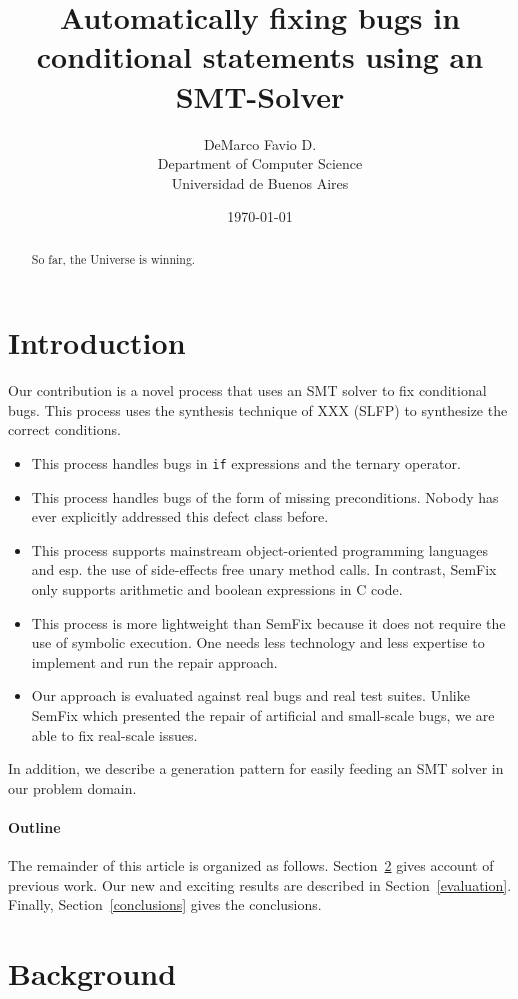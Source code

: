 \documentclass[a4paper,10pt,twocolumn]{article}
\date{\today}
\title{Automatically fixing bugs in conditional statements using an SMT-Solver}
\author{
        DeMarco Favio D. \\
                Department of Computer Science\\
                Universidad de Buenos Aires
}
\begin{document}
\maketitle

\begin{abstract}
So far, the Universe is winning.
\end{abstract}

\section{Introduction}

Our contribution is a novel process that uses an SMT solver to fix conditional bugs.
 This process uses the synthesis technique of XXX (SLFP) to synthesize the correct conditions.
\begin{itemize}
 \item This process handles bugs in \texttt{if} expressions and the ternary operator.
 \item This process handles bugs of the form of missing preconditions. Nobody has ever explicitly addressed this defect class before.
 \item This process supports mainstream object-oriented programming languages and esp. the use of side-effects free unary method calls. In contrast, SemFix only supports arithmetic and boolean expressions in C code.
 \item This process is more lightweight than SemFix because it does not require the use of symbolic execution. One needs less technology and less expertise to implement and run the repair approach.
 \item Our approach is evaluated against real bugs and real test suites. Unlike SemFix which presented the repair of artificial and small-scale bugs, we are able to fix real-scale issues.
\end{itemize}

In addition, we describe a generation pattern for easily feeding an SMT solver in our problem domain.

\paragraph{Outline}
The remainder of this article is organized as follows.
Section~\ref{background} gives account of previous work.
Our new and exciting results are described in Section~\ref{evaluation}.
Finally, Section~\ref{conclusions} gives the conclusions.

\section{Background}
\label{background}
\end{document}

